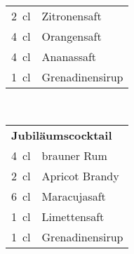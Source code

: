 \begin{table}[h!]
\begin{subtable}[t]{0.3\textwidth}
\begin{tabular}{|rl|}
      \SI{2}{\centi\litre} & Zitronensaft \\
      \SI{4}{\centi\litre} & Orangensaft \\
      \SI{4}{\centi\litre} & Ananassaft \\
      \SI{1}{\centi\litre} & Grenadinensirup \\ \hline
    \end{tabular}
  \end{subtable}
  ~
  \begin{subtable}[t]{0.3\textwidth}
    \vspace{0pt}
    \begin{tabular}{|rl|} \hline
      \multicolumn{2}{|l|}{\textbf{Jubiläumscocktail}} \\
      \SI{4}{\centi\litre} & brauner Rum \\
      \SI{2}{\centi\litre} & Apricot Brandy \\
      \SI{6}{\centi\litre} & Maracujasaft \\
      \SI{1}{\centi\litre} & Limettensaft \\
      \SI{1}{\centi\litre} & Grenadinensirup \\ \hline
    \end{tabular}
  \end{subtable}


\end{table}

